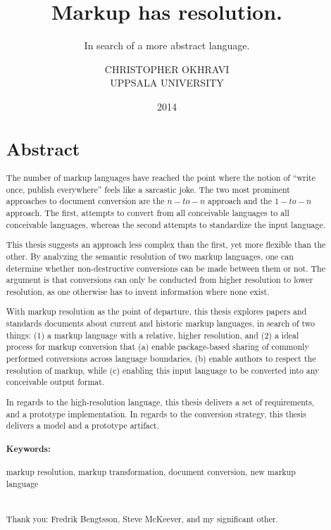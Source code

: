\documentclass{scrreprt}
\date{2014}
\title{ Markup has resolution. }
\subtitle{In search of a more abstract language.}
\author{ CHRISTOPHER OKHRAVI \\ UPPSALA UNIVERSITY }
\begin{document}
\maketitle






%
%
%
%
%
%


\begin{abstract}
\section*{Abstract}
The number of markup languages have reached the point where the notion of ``write once, publish everywhere'' feels like a sarcastic joke. The two most prominent approaches to document conversion are the $n-to-n$ approach and the $1-to-n$ approach. The first, attempts to convert from all conceivable languages to all conceivable languages, whereas the second attempts to standardize the input language.

This thesis suggests an approach less complex than the first, yet more flexible than the other. By analyzing the semantic resolution of two markup languages, one can determine whether non-destructive conversions can be made between them or not. The argument is that conversions can only be conducted from higher resolution to lower resolution, as one otherwise has to invent information where none exist.

With markup resolution as the point of departure, this thesis explores papers and standards documents about current and historic markup languages, in search of two things: (1) a markup language with a relative, higher resolution, and (2) a ideal process for markup conversion that (a) enable package-based sharing of commonly performed conversions across language boundaries, (b) enable authors to respect the resolution of markup, while (c) enabling this input language to be converted into any conceivable output format.

In regards to the high-resolution language, this thesis delivers a set of requirements, and a prototype implementation. In regards to the conversion strategy, this thesis delivers a model and a prototype artifact.\\


\paragraph{Keywords:} markup resolution, markup transformation, document conversion, new markup language \\ \\


\smaller
\paragraph{}
\noindent Thank you: Fredrik Bengtsson, Steve McKeever, and my significant other.
\end{abstract}
\end{document}

